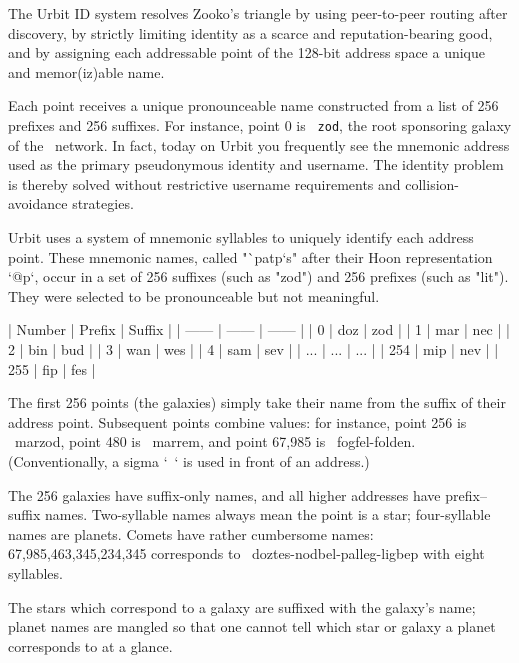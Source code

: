 {{{The Urbit ID system resolves Zooko's triangle by using peer-to-peer routing after discovery, by strictly limiting identity as a scarce and reputation-bearing good, and by assigning each addressable point of the 128-bit address space a unique and memor(iz)able name.

Each point receives a unique pronounceable name constructed from a list of 256 prefixes and 256 suffixes.  For instance, point $0$ is \texttt{~zod}, the root sponsoring galaxy of the \ames~network.  In fact, today on Urbit you frequently see the mnemonic address used as the primary pseudonymous identity and username.  The identity problem is thereby solved without restrictive username requirements and collision-avoidance strategies.

Urbit uses a system of mnemonic syllables to uniquely identify each address point.  These mnemonic names, called "`patp`s" after their Hoon representation `@p`, occur in a set of 256 suffixes (such as "zod") and 256 prefixes (such as "lit").  They were selected to be pronounceable but not meaningful.

| Number | Prefix | Suffix |
| ------ | ------ | ------ |
|      0 |    doz |    zod |
|      1 |    mar |    nec |
|      2 |    bin |    bud |
|      3 |    wan |    wes |
|      4 |    sam |    sev |
|    ... |    ... |    ... |
|    254 |    mip |    nev |
|    255 |    fip |    fes |

The first 256 points (the galaxies) simply take their name from the suffix of their address point.  Subsequent points combine values:  for instance, point 256 is ~marzod, point 480 is ~marrem, and point 67,985 is ~fogfel-folden.  (Conventionally, a sigma `~` is used in front of an address.)

The 256 galaxies have suffix-only names, and all higher addresses have prefix–suffix names.  Two-syllable names always mean the point is a star; four-syllable names are planets.  Comets have rather cumbersome names:  67,985,463,345,234,345 corresponds to ~doztes-nodbel-palleg-ligbep with eight syllables.

The stars which correspond to a galaxy are suffixed with the galaxy's name; planet names are mangled so that one cannot tell which star or galaxy a planet corresponds to at a glance.

}}}
